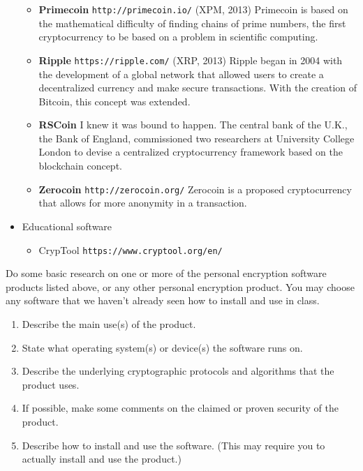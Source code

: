 \begin{itemize}
\begin{itemize}
			\item {\bf Primecoin} {\tt http://primecoin.io/}  (XPM, 2013)  Primecoin is based on the mathematical difficulty of finding chains of prime numbers, the first cryptocurrency to be based on a problem in scientific computing.
			\item {\bf Ripple} {\tt  https://ripple.com/} (XRP, 2013) Ripple began in 2004 with the development of a global network that allowed users to create a decentralized currency and make secure transactions. With the creation of Bitcoin, this concept was extended.
			\item {\bf RSCoin} I knew it was bound to happen. The central bank of the U.K., the Bank of England, commissioned two researchers at University College London to devise a centralized cryptocurrency framework based on the blockchain concept.
			\item {\bf Zerocoin} {\tt  http://zerocoin.org/} Zerocoin is a proposed cryptocurrency that allows for more anonymity in a transaction.
		\end{itemize}
	\item Educational software
	\begin{itemize}
		\item CrypTool {\tt https://www.cryptool.org/en/}
	\end{itemize}
	\end{itemize}

\begin{problem}  [20 points]
	Do some basic research on one or more of the personal encryption software products listed above, or any other personal encryption product. You may choose any software that we haven't already seen how to install and use in class.
	\begin{enumerate}
		\item Describe the main use(s) of the product.
		\item State what operating system(s) or device(s) the software runs on.
		\item Describe the underlying cryptographic protocols and algorithms that the product uses.
		\item If possible, make some comments on the claimed or proven security of the product.
		\item Describe how to install and use the software. (This may require you to actually install and use the product.)
	\end{enumerate}
\end{problem}
